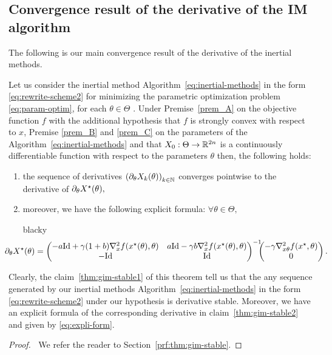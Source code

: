 \subsection{Convergence result of the derivative of the IM algorithm}	\label{subsec:gim-stable}
The following is our main convergence result of the derivative of the  inertial methods.
\begin{theorem}\label{thm:gim-stable} Let us consider the  inertial method Algorithm~\ref{eq:inertial-methods} in the form \eqref{eq:rewrite-scheme2} for minimizing the parametric optimization problem \eqref{eq:param-optim}, for each $ \theta\in\Theta$ . Under Premise~\ref{prem_A} on the objective function $f$ with the additional hypothesis that $f$ is strongly convex with respect to $x$, Premise \ref{prem_B} and \ref{prem_C} on the parameters of the Algorithm~\ref{eq:inertial-methods}  and that $X_0:\Theta\to\mathbb{R}^{2n}$ is a continuously differentiable function with respect to the parameters $\theta$ then, the following holds:
\begin{enumerate}
\item\label{thm:gim-stable1} the sequence of derivatives $\left(\partial_{\theta}X_{k}(\theta)\right)_{k\in\mathbb{N}}$ converges pointwise to the derivative of  $\partial_{\theta}X^{\star}(\theta),$ 
\item\label{thm:gim-stable2} moreover, we have the following explicit  formula:  $\forall\theta\in\Theta,$
\begin{centerbox}{black}{}y
\small{
\begin{equation}\label{eq:expli-form}
 \hspace{-0.8cm}\partial_{\theta}X^{\star}\pa{\theta}=\begin{pmatrix} -a\Id+\gamma(1+b)\nabla_x^2f(\xsol(\theta),\theta) &a\Id-\gamma b\nabla_x^2f(\xsol\pa{\theta},\theta) \\ -\Id  & 
		\Id\end{pmatrix}^{-1}\hspace{-0.2cm}\begin{pmatrix} -\gamma\nabla_{x\theta}^2f(\xsol,\theta)  \\  
		0\end{pmatrix}.
\end{equation}}
\end{centerbox}

\end{enumerate}
\end{theorem}
\begin{remark} Clearly,  the claim~\ref{thm:gim-stable1} of this  theorem tell us that the  any sequence generated by our inertial methods Algorithm~\ref{eq:inertial-methods} in the form \eqref{eq:rewrite-scheme2}  under our hypothesis is derivative stable. Moreover, we have an explicit formula of the corresponding derivative in claim~\ref{thm:gim-stable2} and given by \eqref{eq:expli-form}.
\end{remark}
\begin{proof}$~$ 
We refer the reader to Section~\ref{prf:thm:gim-stable}.
\end{proof}

